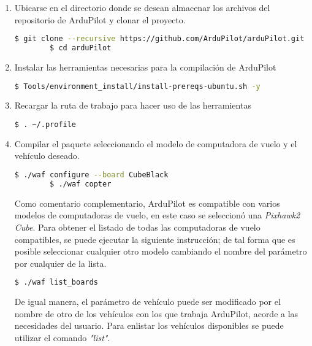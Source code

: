 \begin{enumerate}

    \item Ubicarse en el directorio donde se desean almacenar los archivos del repositorio de ArduPilot y clonar el proyecto.

    \begin{lstlisting}[language = bash]
        $ git clone --recursive https://github.com/ArduPilot/arduPilot.git
        $ cd arduPilot
    \end{lstlisting}    

    \item Instalar las herramientas necesarias para la compilación de ArduPilot
    
    \begin{lstlisting}[language = bash]
        $ Tools/environment_install/install-prereqs-ubuntu.sh -y
    \end{lstlisting}   

    \item Recargar la ruta de trabajo para hacer uso de las herramientas
    
    \begin{lstlisting}[language = bash]
        $ . ~/.profile
    \end{lstlisting}   

    \item Compilar el paquete seleccionando el modelo de computadora de vuelo y el vehículo deseado.

    \begin{lstlisting}[language = bash]
        $ ./waf configure --board CubeBlack
        $ ./waf copter
    \end{lstlisting}

    Como comentario complementario, ArduPilot es compatible con varios modelos de computadoras de vuelo, en este caso se seleccionó una \textit{Pixhawk2 Cube}. Para obtener el listado de todas las computadoras de vuelo compatibles, se puede ejecutar la siguiente instrucción; de tal forma que es posible seleccionar cualquier otro modelo cambiando el nombre del parámetro por cualquier de la lista. 

    \begin{lstlisting}[language = bash]
        $ ./waf list_boards
    \end{lstlisting}

    De igual manera, el parámetro de vehículo puede ser modificado por el nombre de otro de los vehículos con los que trabaja ArduPilot, acorde a las necesidades del usuario. Para enlistar los vehículos disponibles se puede utilizar el comando \textit{"list"}.
    

\end{enumerate}

